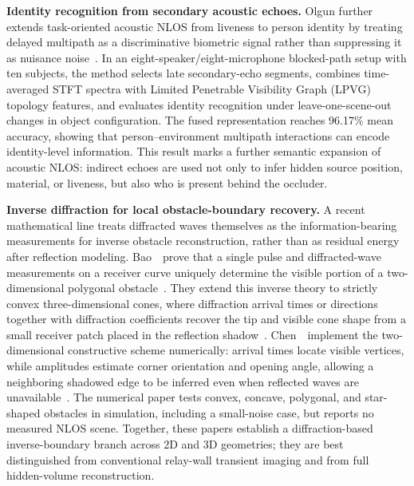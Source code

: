\vspace{0.8mm}
\noindent \textbf{Identity recognition from secondary acoustic echoes.}
Olgun further extends task-oriented acoustic NLOS from liveness to person identity by treating delayed multipath as a discriminative biometric signal rather than suppressing it as nuisance noise~\cite{olgunAcousticIdentityNLOS2026}. In an eight-speaker/eight-microphone blocked-path setup with ten subjects, the method selects late secondary-echo segments, combines time-averaged STFT spectra with Limited Penetrable Visibility Graph (LPVG) topology features, and evaluates identity recognition under leave-one-scene-out changes in object configuration. The fused representation reaches 96.17\% mean accuracy, showing that person--environment multipath interactions can encode identity-level information. This result marks a further semantic expansion of acoustic NLOS: indirect echoes are used not only to infer hidden source position, material, or liveness, but also who is present behind the occluder.

\vspace{0.8mm}
\noindent \textbf{Inverse diffraction for local obstacle-boundary recovery.}
A recent mathematical line treats diffracted waves themselves as the information-bearing measurements for inverse obstacle reconstruction, rather than as residual energy after reflection modeling. Bao~\etal~prove that a single pulse and diffracted-wave measurements on a receiver curve uniquely determine the visible portion of a two-dimensional polygonal obstacle~\cite{baoInverseScatteringDiffractedWaves2026}. They extend this inverse theory to strictly convex three-dimensional cones, where diffraction arrival times or directions together with diffraction coefficients recover the tip and visible cone shape from a small receiver patch placed in the reflection shadow~\cite{baoInverseGeometricDiffractionCone2026}. Chen~\etal~implement the two-dimensional constructive scheme numerically: arrival times locate visible vertices, while amplitudes estimate corner orientation and opening angle, allowing a neighboring shadowed edge to be inferred even when reflected waves are unavailable~\cite{chenPolygonalObstacleDiffractionNLOS2026}. The numerical paper tests convex, concave, polygonal, and star-shaped obstacles in simulation, including a small-noise case, but reports no measured NLOS scene. Together, these papers establish a diffraction-based inverse-boundary branch across 2D and 3D geometries; they are best distinguished from conventional relay-wall transient imaging and from full hidden-volume reconstruction.

